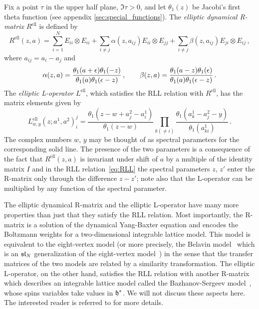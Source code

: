Fix a point $\tau$ in the upper half plane, $\Im\tau > 0$, and let
$\theta_1(z)$ be Jacobi's first theta function (see appendix \ref{sec:special_functions}).
The \emph{elliptic dynamical R-matrix} $R^{\text{ell}}$ is defined
by~\cite{Felder:1994be,Felder:1994pb, MR1645196}
\begin{equation}
  R^{\text{ell}}(z,a)
  =
  \sum_{i=1}^N E_{ii} \otimes E_{ii}
  + \sum_{i \neq j} \alpha(z,a_{ij}) E_{ii} \otimes E_{jj}
  + \sum_{i \neq j} \beta(z,a_{ij}) E_{ji} \otimes E_{ij}
  \,,
\end{equation}
where $a_{ij} = a_i - a_j$ and
\begin{equation}
  \alpha(z,a)
  = \frac{\theta_1(a+\epsilon) \theta_1(-z)}
          {\theta_1(a) \theta_1(\epsilon - z)} \,,
  \qquad
  \beta(z,a)
  = \frac{\theta_1(a - z) \theta_1(\epsilon)}
          {\theta_1(a) \theta_1(\epsilon - z)} \,.
\end{equation}
The \emph{elliptic L-operator} $L^{\text{ell}}$, which satisfies the
RLL relation with $R^{\text{ell}}$, has the matrix elements given
by~\cite{MR1463830}
\begin{equation}
  \label{eq:L-ell}
  L^{\text{ell}}_{w,y}(z; a^1, a^2)^j_i
  =
  \frac{\theta_1(z - w + a^2_j - a^1_i)}{\theta_1(z - w)}
  \prod_{k (\neq i)}
  \frac{\theta_1(a^1_k - a^2_j - y)}{\theta_1(a^1_{ki})}
  \,.
\end{equation}
The complex numbers $w$, $y$ may be thought of as spectral parameters
for the corresponding solid line.  The presence of the two parameters
is a consequence of the fact that $R^{\text{ell}}(z,a)$ is invariant
under shift of $a$ by a multiple of the identity matrix $I$ and in the
RLL relation~\eqref{eq:RLL} the spectral parameters $z$, $z'$ enter
the R-matrix only through the difference $z - z'$; note also that the
L-operator can be multiplied by any function of the spectral
parameter.

The elliptic dynamical R-matrix and the elliptic L-operator have many
more properties than just that they satisfy the RLL relation.  Most
importantly, the R-matrix is a solution of the dynamical Yang-Baxter
equation and encodes the Boltzmann weights for a two-dimensional
integrable lattice model.  This model is equivalent to the
eight-vertex model (or more precisely, the Belavin
model~\cite{Belavin:1981ix} which is an $\mathfrak{sl}_N$ generalization of the
eight-vertex model~\cite{Baxter:1971cr, Baxter:1972hz}) in the sense
that the transfer matrices of the two models are related by a
similarity transformation.  The elliptic L-operator, on the other
hand, satisfies the RLL relation with another R-matrix which describes
an integrable lattice model called the Bazhanov-Sergeev
model~\cite{Bazhanov:2010kz, Bazhanov:2011mz}, whose spins variables
take values in $\mathfrak{h}^*$.  We will not discuss these aspects here.
The interested reader is referred to \cite{Yagi:2017hmj} for
more details.





